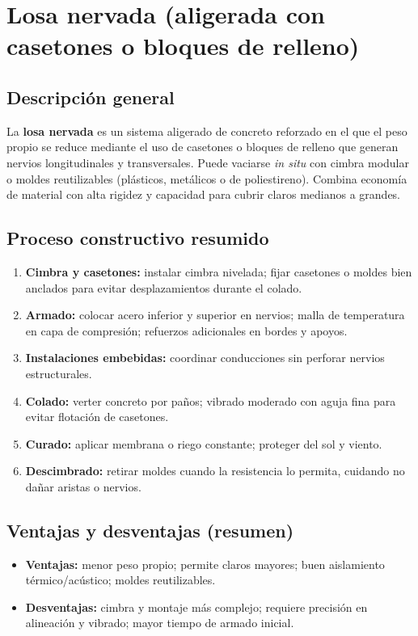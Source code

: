 \documentclass[12pt]{article}
\begin{document}
 
 
 
 \section{Losa nervada (aligerada con casetones o bloques de relleno)}
 
 \subsection*{Descripción general}
 La \textbf{losa nervada} es un sistema aligerado de concreto reforzado en el que el peso propio se reduce mediante el uso de casetones o bloques de relleno que generan nervios longitudinales y transversales. Puede vaciarse \emph{in situ} con cimbra modular o moldes reutilizables (plásticos, metálicos o de poliestireno). Combina economía de material con alta rigidez y capacidad para cubrir claros medianos a grandes.
 
 \subsection*{Proceso constructivo resumido}
 \begin{enumerate}[leftmargin=*, itemsep=2pt]
 	\item \textbf{Cimbra y casetones:} instalar cimbra nivelada; fijar casetones o moldes bien anclados para evitar desplazamientos durante el colado.
 	\item \textbf{Armado:} colocar acero inferior y superior en nervios; malla de temperatura en capa de compresión; refuerzos adicionales en bordes y apoyos.
 	\item \textbf{Instalaciones embebidas:} coordinar conducciones sin perforar nervios estructurales.
 	\item \textbf{Colado:} verter concreto por paños; vibrado moderado con aguja fina para evitar flotación de casetones.
 	\item \textbf{Curado:} aplicar membrana o riego constante; proteger del sol y viento.
 	\item \textbf{Descimbrado:} retirar moldes cuando la resistencia lo permita, cuidando no dañar aristas o nervios.
 \end{enumerate}
 
 \subsection*{Ventajas y desventajas (resumen)}
 \begin{itemize}[leftmargin=*, itemsep=2pt]
 	\item \textbf{Ventajas:} menor peso propio; permite claros mayores; buen aislamiento térmico/acústico; moldes reutilizables.
 	\item \textbf{Desventajas:} cimbra y montaje más complejo; requiere precisión en alineación y vibrado; mayor tiempo de armado inicial.
 \end{itemize}
 
\end{document}
